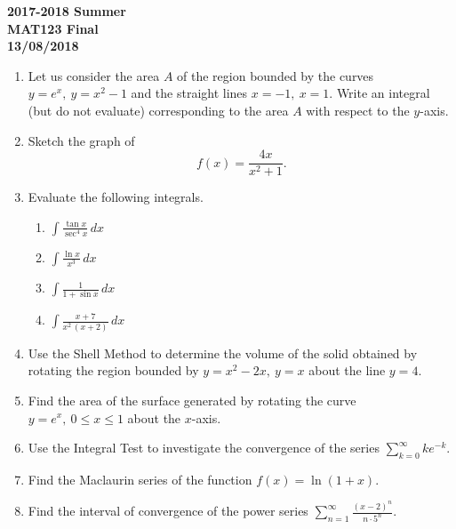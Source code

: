 \documentclass[a4paper, 12pt]{article}
\renewcommand{\headrulewidth}{0pt}
\begin{document}
\pagestyle{empty}

\begin{center}
\textbf{2017-2018 Summer\\MAT123 Final\\13/08/2018}
\end{center}

\begin{enumerate}[leftmargin=*,label=\textbf{\arabic*.}]
\item Let us consider the area $A$ of the region bounded by the curves $y= e^x,\:y=x^2-1$ and the straight lines $x=-1,\:x=1$. Write an integral (but do not evaluate) corresponding to the area $A$ with respect to the $y$-axis.

\item Sketch the graph of
\[f(x)=\frac{4x}{x^2+1}.\]

\item Evaluate the following integrals.

\begin{enumerate}[leftmargin=*,label=\textbf{\alph*.}]
\item $\displaystyle\int\frac{\tan x}{\sec^4x}\,dx$
\item $\displaystyle\int\frac{\ln x}{x^3}\,dx$
\item $\displaystyle\int\frac1{1+\sin x}\,dx$
\item $\displaystyle\int\frac{x+7}{x^2\,(x+2)}\,dx$
\end{enumerate}

\item Use the Shell Method to determine the volume of the solid obtained by rotating the region bounded by $y=x^2-2x,\:y=x$ about the line $y=4$.

\item Find the area of the surface generated by rotating the curve $y= e^x,\:0\leq x\leq1$ about the $x$-axis.

\item Use the Integral Test to investigate the convergence of the series $\displaystyle\sum_{k=0}^{\infty}k e^{-k}$.

\item Find the Maclaurin series of the function $f(x)=\ln(1+x)$.

\item Find the interval of convergence of the power series $\displaystyle\sum_{n=1}^{\infty}\frac{(x-2)^n}{n\cdot 5^n}$.
\end{enumerate}

\newpage
\pagestyle{fancy}
\renewcommand{\headrulewidth}{1pt}
\end{document}
